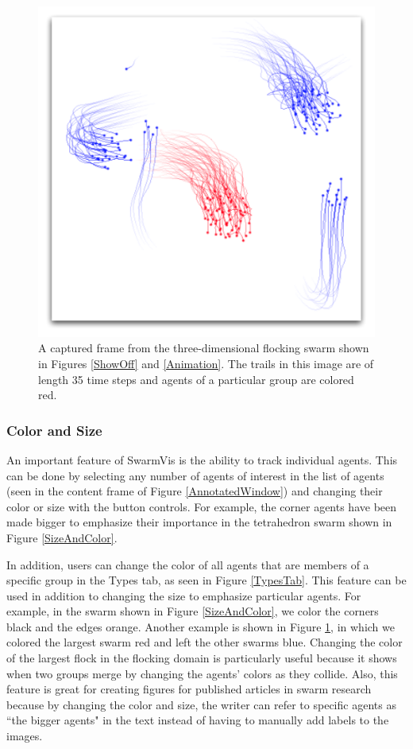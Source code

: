 \documentclass[conference]{IEEEtran}
\begin{document}
\begin{figure}
\centering
\includegraphics[scale=.5]{images/flockcolor.pdf}
\caption{
A captured frame from the three-dimensional flocking swarm shown in Figures \ref{ShowOff} and \ref{Animation}.
The trails in this image are of length 35 time steps and agents of a particular group are colored red.}
\label{FlockColor}
\end{figure}


\subsubsection{Color and Size}

An important feature of SwarmVis is the ability to track individual agents.
This can be done by selecting any number of agents of interest in the list of agents
(seen in the content frame of Figure \ref{AnnotatedWindow})
and changing their color or size with the button controls.
For example, the corner agents have been made bigger to emphasize their importance
in the tetrahedron swarm shown in Figure \ref{SizeAndColor}.

In addition, users can change
the color of all agents that are members of a specific group in the Types tab, as seen
in Figure \ref{TypesTab}. This feature can be used in addition to changing the size to
emphasize particular agents. For example, in the swarm shown in
Figure \ref{SizeAndColor}, we color the corners black and the edges orange. Another
example is shown in Figure \ref{FlockColor}, in which we colored the largest swarm
red and left the other swarms blue. Changing the color of the largest flock in the flocking domain is
particularly useful because it shows when two groups merge by changing the agents' colors
as they collide.
Also, this feature is great for creating figures for published articles in swarm research because
by changing the color and size, the writer can refer to specific agents as ``the bigger agents"
in the text instead of having to manually add labels to the images.
\end{document}
